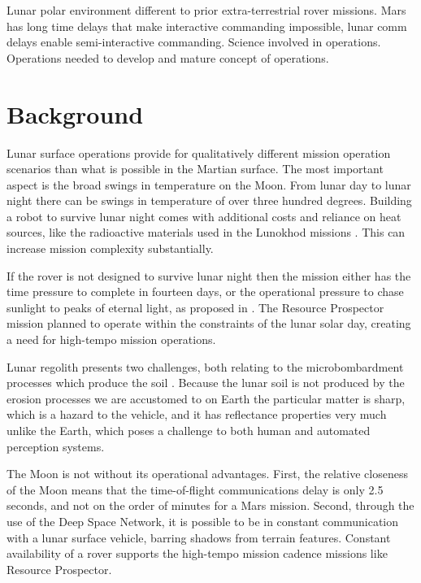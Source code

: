 \documentclass[twocolumn,letterpaper]{IEEEAerospaceCLS}  %
\begin{document}
Lunar polar environment different to prior extra-terrestrial rover missions. Mars has long time delays that make interactive commanding impossible, lunar comm delays enable semi-interactive commanding. Science involved in operations. Operations needed to develop and mature concept of operations.  

\section{Background}


Lunar surface operations provide for qualitatively different mission operation scenarios than what is possible in the Martian surface.  The most important aspect is the broad swings in temperature on the Moon.  From lunar day to lunar night there can be swings in temperature of over three hundred degrees.  Building a robot to survive lunar night comes with additional costs and reliance on heat sources, like the radioactive materials used in the Lunokhod missions \cite{XXX}.  This can increase mission complexity substantially.  

If the rover is not designed to survive lunar night then the mission either has the time pressure to complete in fourteen days, or the operational pressure to chase sunlight to peaks of eternal light, as proposed in \cite{otten2018strategic}.  The Resource Prospector mission planned to operate within the constraints of the lunar solar day, creating a need for high-tempo mission operations. 

Lunar regolith presents two challenges, both relating to the microbombardment processes which produce the soil \cite{XXX}.  Because the lunar soil is not produced by the erosion processes we are accustomed to on Earth the particular matter is sharp, which is a hazard to the vehicle, and it has reflectance properties very much unlike the Earth, which poses a challenge to both human and automated perception systems.

The Moon is not without its operational advantages.  First, the relative closeness of the Moon means that the time-of-flight communications delay is only 2.5 seconds, and not on the order of minutes for a Mars mission.  Second, through the use of the Deep Space Network, it is possible to be in constant communication with a lunar surface vehicle, barring shadows from terrain features.  Constant availability of a rover supports the high-tempo mission cadence missions like Resource Prospector.
\end{document}
